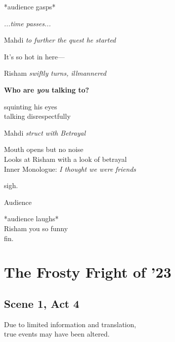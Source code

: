\documentclass[12pt]{article}
\begin{document}
\smallskip

\begin{center}
    *audience gasps*
\end{center}

\smallskip

\begin{center}
    \textit{...time passes...}
\end{center}

Mahdi
\textit{  to further the quest he started}
\begin{center}
    It's so hot in here---\\
\end{center}

\smallskip 

Risham
\textit{  swiftly turns, illmannered}
\begin{center}
    \textbf{Who are \textit{you} talking to?}
\end{center}
\begin{flushright}
    squinting his eyes\\talking disrespectfully
\end{flushright}

Mahdi
\textit{  struct with Betrayal}
\begin{flushright}
    Mouth opens but no noise\\
    Looks at Risham with a look of betrayal\\
    \tiny{Inner Monologue:} \textit{I thought we were friends}
\end{flushright}
\begin{center}
    sigh.
\end{center}

Audience
\begin{center}
    *audience laughs*\\
    Risham you so funny\\
    fin.
\end{center}

\newpage
\section*{The Frosty Fright of '23}
\subsection*{Scene 1, Act 4}
\smallskip
\begin{center}
    \tiny{Due to limited information and translation,\\true events may have been altered.}
\end{center}
\end{document}
